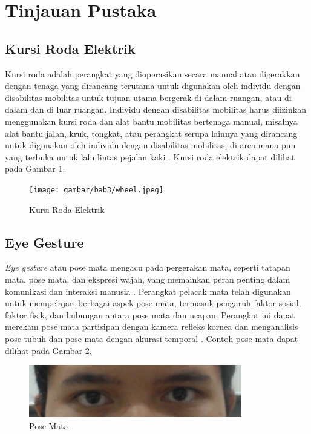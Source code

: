\section{Tinjauan Pustaka}
\label{sec:tinjauanpustaka}

\subsection{Kursi Roda Elektrik}
Kursi roda adalah perangkat yang dioperasikan secara manual atau digerakkan dengan tenaga yang dirancang terutama untuk digunakan oleh individu dengan disabilitas mobilitas untuk tujuan utama bergerak di dalam ruangan, atau di dalam dan di luar ruangan.  Individu dengan disabilitas mobilitas harus diizinkan menggunakan kursi roda dan alat bantu mobilitas bertenaga manual, misalnya alat bantu jalan, kruk, tongkat, atau perangkat serupa lainnya yang dirancang untuk digunakan oleh individu dengan disabilitas mobilitas, di area mana pun yang terbuka untuk lalu lintas pejalan kaki \cite{ADA_2023}. Kursi roda elektrik dapat dilihat pada Gambar \ref{fig:kursiroda}.

\begin{figure}[ht]
  \centering

  \texttt{[image: gambar/bab3/wheel.jpeg]}

  \caption{Kursi Roda Elektrik}
  \label{fig:kursiroda}
\end{figure}

\subsection{Eye Gesture}

\textit{Eye gesture} atau pose mata mengacu pada pergerakan mata, seperti tatapan mata, pose mata, dan ekspresi wajah, yang memainkan peran penting dalam komunikasi dan interaksi manusia \cite{vanni_2022}. Perangkat pelacak mata telah digunakan untuk mempelajari berbagai aspek pose mata, termasuk pengaruh faktor sosial, faktor fisik, dan hubungan antara pose mata dan ucapan. Perangkat ini dapat merekam pose mata partisipan dengan kamera refleks kornea dan menganalisis pose tubuh dan pose mata dengan akurasi temporal \cite{gullberg_kita_2009}. Contoh pose mata dapat dilihat pada Gambar \ref{fig:gaze}.

\begin{figure} [ht] \centering
    \includegraphics[scale=0.5]{gambar/bab3/gaze.png}
    \caption{Pose Mata}
    \label{fig:gaze}
\end{figure}

